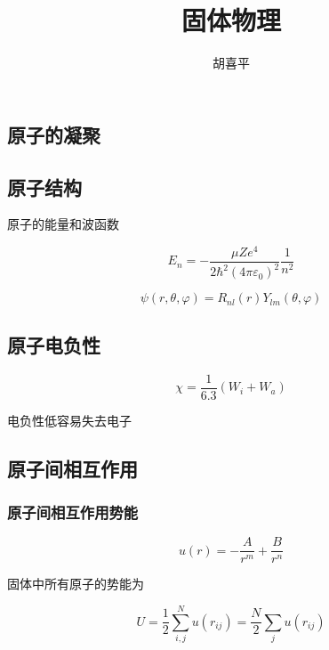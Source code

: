\documentclass{article}
\author{胡喜平}
\title{固体物理}
\begin{document}
\begin{multicols}{2}
  

\section{原子的凝聚}

\subsection{原子结构}

原子的能量和波函数

\begin{equation*}
  E_n = - \dfrac{\mu Z e^{4}}{2 \hbar^{2} \left( 4 \pi \varepsilon_0 \right)^2} \dfrac{1}{n^{2}}
\end{equation*}

\begin{equation*}
  \psi \left( r, \theta, \varphi \right) = R_{nl} \left( r \right) Y_{lm} \left( \theta, \varphi \right)
\end{equation*}

\subsection{原子电负性}

\begin{equation*}
  \chi = \dfrac{1}{6.3} \left( W_i + W_a \right)
\end{equation*}

电负性低容易失去电子

\subsection{原子间相互作用}

\subsubsection{原子间相互作用势能}

\begin{equation*}
  u \left( r \right) = - \dfrac{A}{r^{m}} + \dfrac{B}{r^{n}}
\end{equation*}

固体中所有原子的势能为

\begin{equation*}
  U = \dfrac{1}{2} \sum_{i,j}^N u \left( r_{ij} \right) = \dfrac{N}{2} \sum_j u \left( r_{ij} \right)
\end{equation*}


\end{multicols}
\end{document}
